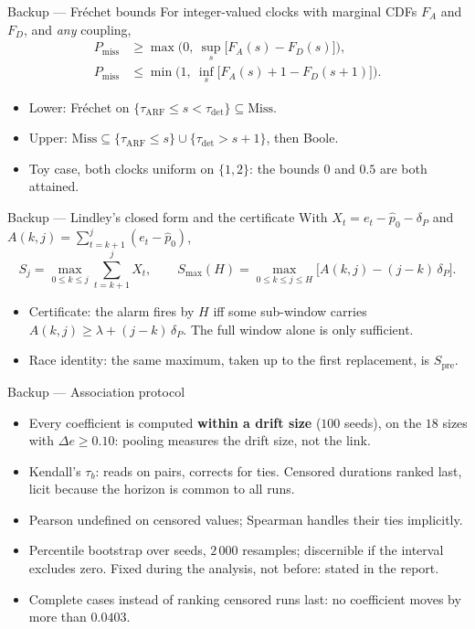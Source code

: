 \documentclass[aspectratio=169,11pt]{beamer}
\begin{document}
\begin{frame}{Backup --- Fréchet bounds}
  For integer-valued clocks with marginal CDFs $F_A$ and $F_D$, and \emph{any} coupling,
  \begin{align*}
    P_{\mathrm{miss}} &\ge \max\Big(0,\ \sup_{s} \big[F_A(s)-F_D(s)\big]\Big),\\
    P_{\mathrm{miss}} &\le \min\Big(1,\ \inf_{s} \big[F_A(s) + 1 - F_D(s+1)\big]\Big).
  \end{align*}
  \begin{itemize}
    \item Lower: Fréchet on $\{\tau_{\mathrm{ARF}} \le s < \tau_{\mathrm{det}}\} \subseteq \mathrm{Miss}$.
    \item Upper: $\mathrm{Miss} \subseteq \{\tau_{\mathrm{ARF}} \le s\} \cup \{\tau_{\mathrm{det}} > s+1\}$, then Boole.
    \item Toy case, both clocks uniform on $\{1,2\}$: the bounds $0$ and $0.5$ are both attained.
  \end{itemize}
\end{frame}

\begin{frame}{Backup --- Lindley's closed form and the certificate}
  With $X_t = e_t - \hat p_0 - \delta_P$ and $A(k,j) = \sum_{t=k+1}^{j} (e_t - \hat p_0)$,
  \[
    S_j = \max_{0 \le k \le j} \sum_{t=k+1}^{j} X_t,
    \qquad
    S_{\max}(H) = \max_{0 \le k \le j \le H} \big[A(k,j) - (j-k)\,\delta_P\big].
  \]
  \begin{itemize}
    \item Certificate: the alarm fires by $H$ iff some sub-window carries
          $A(k,j) \ge \lambda + (j-k)\,\delta_P$. The full window alone is only sufficient.
    \item Race identity: the same maximum, taken up to the first replacement, is $S_{\mathrm{pre}}$.
  \end{itemize}
\end{frame}

\begin{frame}{Backup --- Association protocol}
  \begin{itemize}
    \item Every coefficient is computed \textbf{within a drift size} ($100$ seeds), on the $18$
          sizes with $\Delta e \ge 0.10$: pooling measures the drift size, not the link.
    \item Kendall's $\tau_b$: reads on pairs, corrects for ties. Censored durations ranked last,
          licit because the horizon is common to all runs.
    \item Pearson undefined on censored values; Spearman handles their ties implicitly.
    \item Percentile bootstrap over seeds, $2\,000$ resamples; discernible if the interval
          excludes zero. Fixed during the analysis, not before: stated in the report.
    \item Complete cases instead of ranking censored runs last: no coefficient moves by more
          than $0.0403$.
  \end{itemize}
\end{frame}
\end{document}
